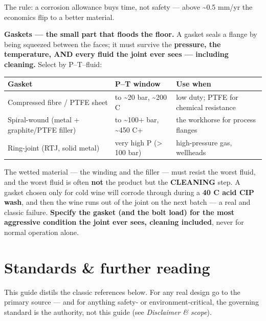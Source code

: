 \documentclass[11pt,a4paper]{article}
\begin{document}
The rule: a corrosion allowance buys time, not safety --- above
\textasciitilde0.5 mm/yr the economics flip to a better material.

\textbf{Gaskets --- the small part that floods the floor.} A gasket
seals a flange by being squeezed between the faces; it must survive the
\textbf{pressure, the temperature, AND every fluid the joint ever sees
--- including cleaning.} Select by P--T--fluid:

\begin{longtable}[]{@{}>{\raggedright\arraybackslash}p{\dimexpr(\linewidth-6\tabcolsep)/3\relax}>{\raggedright\arraybackslash}p{\dimexpr(\linewidth-6\tabcolsep)/3\relax}>{\raggedright\arraybackslash}p{\dimexpr(\linewidth-6\tabcolsep)/3\relax}@{}}
\toprule\noalign{}
Gasket & P--T window & Use when \\
\midrule\noalign{}
\endhead
\bottomrule\noalign{}
\endlastfoot
Compressed fibre / PTFE sheet & to \textasciitilde20 bar,
\textasciitilde200 \textdegree{}C & low duty; PTFE for chemical resistance \\
Spiral-wound (metal + graphite/PTFE filler) & to \textasciitilde100+
bar, \textasciitilde450 \textdegree{}C+ & the workhorse for process flanges \\
Ring-joint (RTJ, solid metal) & very high P (\textgreater{} 100 bar) &
high-pressure gas, wellheads \\
\end{longtable}

The wetted material --- the winding and the filler --- must resist the
worst fluid, and the worst fluid is often \textbf{not} the product but
the \textbf{CLEANING} step. A gasket chosen only for cold wine will
corrode through during a \textbf{40 \textdegree{}C acid CIP wash}, and then the wine
runs out of the joint on the next batch --- a real and classic failure.
\textbf{Specify the gasket (and the bolt load) for the most aggressive
condition the joint ever sees, cleaning included}, never for normal
operation alone.

\hypertarget{standards--further-reading}{%
\section{Standards \& further
reading}\label{standards--further-reading}}

This guide distils the classic references below. For any real design go
to the primary source --- and for anything safety- or
environment-critical, the governing standard is the authority, not this
guide (see \emph{Disclaimer \& scope}).
\end{document}
